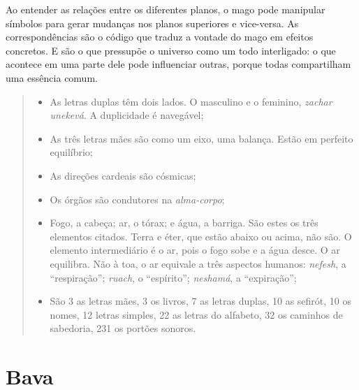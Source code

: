 {Ao entender as relações entre os diferentes planos, o mago pode manipular símbolos para gerar mudanças nos planos superiores e vice-versa. As correspondências são o código que traduz a vontade do mago em efeitos concretos. E são o que pressupõe o universo como um todo interligado: o que acontece em uma parte dele pode influenciar outras, porque todas compartilham uma essência comum.

\asterisc

\begin{quote}
\begin{itemize}
\item{}\quad As letras duplas têm dois lados. O masculino e o feminino, \textit{zachar unekevá}. A duplicidade é navegável;\\
\item{}\quad As três letras mães são como um eixo, uma balança. Estão em perfeito equilíbrio;\\
\item{}\quad As direções cardeais são cósmicas;\\
\item{}\quad Os órgãos são condutores na \textit{alma-corpo};\\
\item{}\quad Fogo, a cabeça; ar, o tórax; e água, a barriga. São estes os três elementos citados. Terra e éter, que estão abaixo ou acima, não são. O elemento intermediário é o ar, pois o fogo sobe e a água desce. O ar equilibra. Não à toa, o ar equivale a três aspectos humanos: \textit{nefesh}, a ``respiração''; \textit{ruach}, o ``espírito''; \textit{neshamá}, a ``expiração'';\\
\item{}\quad São 3 as letras mães, 3 os livros, 7 as letras duplas, 10 as sefirót, 10 os nomes, 12 letras simples, 22 as letras do alfabeto, 32 os caminhos de sabedoria, 231 os portões sonoros. 
\end{itemize}
\end{quote}

\chapter*{Bava \smallskip{}}

\begin{center}
{\huge{}}
\end{center}

}
